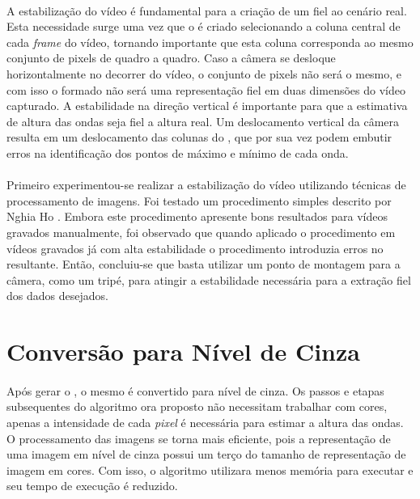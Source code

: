 \paragraph{}A estabilização do vídeo é fundamental para a criação de um \timestack fiel ao cenário real. Esta necessidade surge uma vez que o \timestack é criado selecionando a coluna central de cada \textit{frame} do vídeo, tornando importante que esta coluna corresponda ao mesmo conjunto de pixels de quadro a quadro. Caso a câmera se desloque horizontalmente no decorrer do vídeo, o conjunto de pixels não será o mesmo, e com isso o \timestack formado não será uma representação fiel em duas dimensões do vídeo capturado. A estabilidade na direção vertical é importante para que a estimativa de altura das ondas seja fiel a altura real. Um deslocamento vertical da câmera resulta em um deslocamento das colunas do \timestack, que por sua vez podem embutir erros na identificação dos pontos de máximo e mínimo de cada onda.

\paragraph{}Primeiro experimentou-se realizar a estabilização do vídeo utilizando técnicas de processamento de imagens. Foi testado um procedimento simples descrito por Nghia Ho \cite{Ho2014}. Embora este procedimento apresente bons resultados para vídeos gravados manualmente, foi observado que quando aplicado o procedimento em vídeos gravados já com alta estabilidade o procedimento introduzia erros no \timestack resultante. Então, concluiu-se que basta utilizar um ponto de montagem para a câmera, como um tripé, para atingir a estabilidade necessária para a extração fiel dos dados desejados.


\section{Conversão para Nível de Cinza}

\paragraph{}Após gerar o \timestack, o mesmo é convertido para nível de cinza. Os passos e etapas subsequentes do algoritmo ora proposto não necessitam trabalhar com cores, apenas a intensidade de cada \textit{pixel} é necessária para estimar a altura das ondas. O processamento das imagens se torna mais eficiente, pois a representação de uma imagem em nível de cinza possui um terço do tamanho de representação de imagem em cores. Com isso, o algoritmo utilizara menos memória para executar e seu tempo de execução é reduzido.

